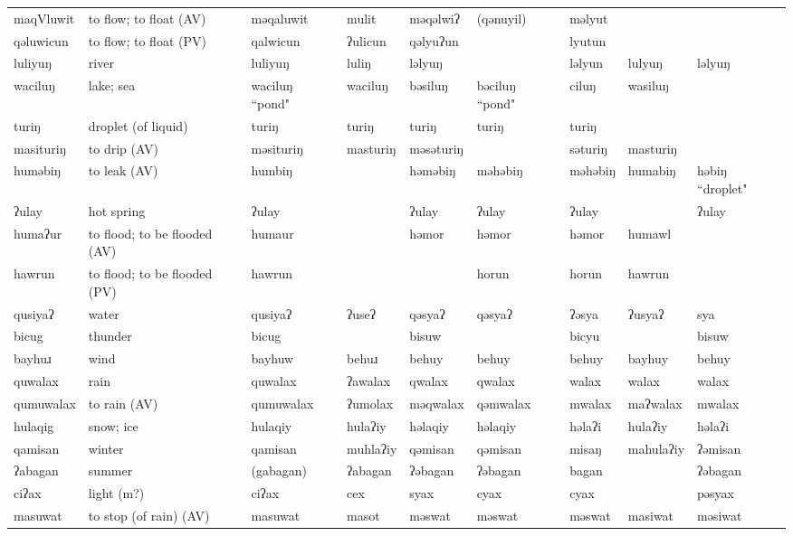 \begin{landscape}
\begin{longtable}{*{9}{>{\raggedright\arraybackslash}p{}}}
\text{*}maqVluwit & to flow; to float (AV) & məqaluwit & mulit & məqəlwiʔ & (qənuyil) & məlyut &  & \\
\text{*}qəluwicun & to flow; to float (PV) & qalwicun & ʔulicun & qəlyuʔun &  & lyutun &  & \\
\text{*}luliyuŋ & river & luliyuŋ & luliŋ & ləlyuŋ &  & ləlyun & lulyuŋ & ləlyuŋ\\
\text{*}waciluŋ & lake; sea & waciluŋ ``pond" & waciluŋ & bəsiluŋ & bəciluŋ ``pond" & ciluŋ & wasiluŋ & \\
\text{*}turiŋ & droplet (of liquid) & turiŋ & turiŋ & turiŋ & turiŋ & turiŋ &  & \\
\text{*}masituriŋ & to drip (AV) & məsituriŋ & masturiŋ & məsəturiŋ &  & səturiŋ & masturiŋ & \\
\text{*}huməbiŋ & to leak (AV) & humbiŋ &  & həməbiŋ & məhəbiŋ & məhəbiŋ & humabiŋ & həbiŋ ``droplet"\\
\text{*}ʔulay & hot spring & ʔulay &  & ʔulay & ʔulay & ʔulay &  & ʔulay\\
\text{*}humaʔur & to flood; to be flooded (AV) & humaur &  & həmor & həmor & həmor & humawl & \\
\text{*}hawrun & to flood; to be flooded (PV) & hawrun &  &  & horun & horun & hawrun & \\
\text{*}qusiyaʔ & water & qusiyaʔ & ʔuseʔ & qəsyaʔ & qəsyaʔ & ʔəsya & ʔusyaʔ & sya\\
\text{*}bicug & thunder & bicug &  & bisuw &  & bicyu &  & bisuw\\
\text{*}bayhuɹ & wind & bayhuw & behuɹ & behuy & behuy & behuy & bayhuy & behuy\\
\text{*}quwalax & rain & quwalax & ʔawalax & qwalax & qwalax & walax & walax & walax\\
\text{*}qumuwalax & to rain (AV) & qumuwalax & ʔumolax & məqwalax & qəmwalax & mwalax & maʔwalax & mwalax\\
\text{*}hulaqig & snow; ice & hulaqiy & hulaʔiy & həlaqiy & həlaqiy & həlaʔi & hulaʔiy & həlaʔi\\
\text{*}qamisan & winter & qamisan & muhlaʔiy & qəmisan & qəmisan & misaŋ & mahulaʔiy & ʔəmisan\\
\text{*}ʔabagan & summer & (gabagan) & ʔabagan & ʔəbagan & ʔəbagan & bagan &  & ʔəbagan\\
\text{*}ciʔax & light (m?) & ciʔax & cex & syax & cyax & cyax &  & pəsyax\\
\text{*}masuwat & to stop (of rain) (AV) & masuwat & masot & məswat & məswat & məswat & masiwat & məsiwat\\

\end{longtable}
\end{landscape}
